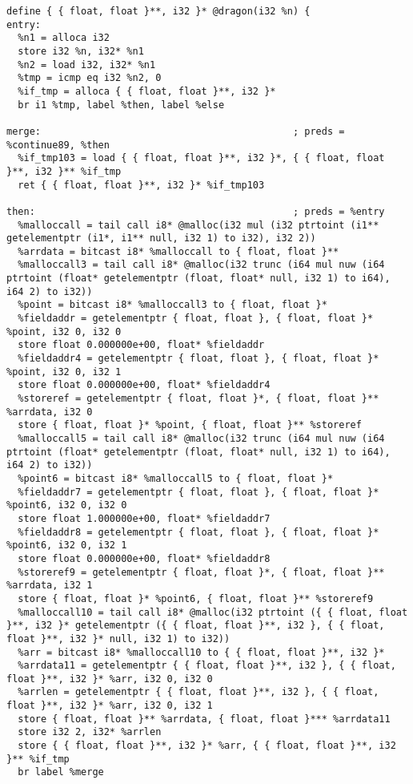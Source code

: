 \documentclass[main.tex]{subfiles}
\begin{document}
{\begin{lstlisting}
define { { float, float }**, i32 }* @dragon(i32 %n) {
entry:
  %n1 = alloca i32
  store i32 %n, i32* %n1
  %n2 = load i32, i32* %n1
  %tmp = icmp eq i32 %n2, 0
  %if_tmp = alloca { { float, float }**, i32 }*
  br i1 %tmp, label %then, label %else

merge:                                            ; preds = %continue89, %then
  %if_tmp103 = load { { float, float }**, i32 }*, { { float, float }**, i32 }** %if_tmp
  ret { { float, float }**, i32 }* %if_tmp103

then:                                             ; preds = %entry
  %malloccall = tail call i8* @malloc(i32 mul (i32 ptrtoint (i1** getelementptr (i1*, i1** null, i32 1) to i32), i32 2))
  %arrdata = bitcast i8* %malloccall to { float, float }**
  %malloccall3 = tail call i8* @malloc(i32 trunc (i64 mul nuw (i64 ptrtoint (float* getelementptr (float, float* null, i32 1) to i64), i64 2) to i32))
  %point = bitcast i8* %malloccall3 to { float, float }*
  %fieldaddr = getelementptr { float, float }, { float, float }* %point, i32 0, i32 0
  store float 0.000000e+00, float* %fieldaddr
  %fieldaddr4 = getelementptr { float, float }, { float, float }* %point, i32 0, i32 1
  store float 0.000000e+00, float* %fieldaddr4
  %storeref = getelementptr { float, float }*, { float, float }** %arrdata, i32 0
  store { float, float }* %point, { float, float }** %storeref
  %malloccall5 = tail call i8* @malloc(i32 trunc (i64 mul nuw (i64 ptrtoint (float* getelementptr (float, float* null, i32 1) to i64), i64 2) to i32))
  %point6 = bitcast i8* %malloccall5 to { float, float }*
  %fieldaddr7 = getelementptr { float, float }, { float, float }* %point6, i32 0, i32 0
  store float 1.000000e+00, float* %fieldaddr7
  %fieldaddr8 = getelementptr { float, float }, { float, float }* %point6, i32 0, i32 1
  store float 0.000000e+00, float* %fieldaddr8
  %storeref9 = getelementptr { float, float }*, { float, float }** %arrdata, i32 1
  store { float, float }* %point6, { float, float }** %storeref9
  %malloccall10 = tail call i8* @malloc(i32 ptrtoint ({ { float, float }**, i32 }* getelementptr ({ { float, float }**, i32 }, { { float, float }**, i32 }* null, i32 1) to i32))
  %arr = bitcast i8* %malloccall10 to { { float, float }**, i32 }*
  %arrdata11 = getelementptr { { float, float }**, i32 }, { { float, float }**, i32 }* %arr, i32 0, i32 0
  %arrlen = getelementptr { { float, float }**, i32 }, { { float, float }**, i32 }* %arr, i32 0, i32 1
  store { float, float }** %arrdata, { float, float }*** %arrdata11
  store i32 2, i32* %arrlen
  store { { float, float }**, i32 }* %arr, { { float, float }**, i32 }** %if_tmp
  br label %merge


\end{lstlisting}}
\end{document}
